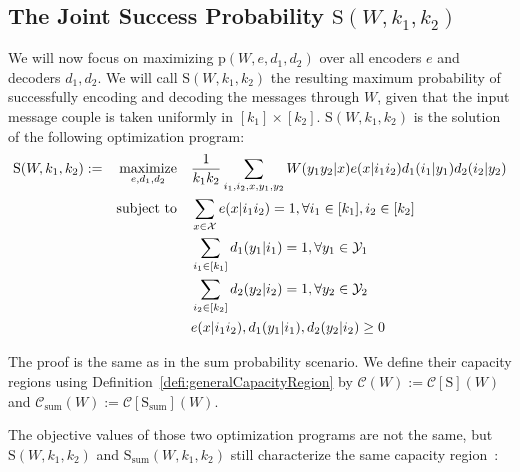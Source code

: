 \subsection{The Joint Success Probability $\mathrm{S}(W,k_1,k_2)$}
We will now focus on maximizing $\mathrm{p}(W,e,d_1,d_2)$ over all encoders $e$ and decoders $d_1,d_2$. We will call $\mathrm{S}(W,k_1,k_2)$ the resulting maximum probability of successfully encoding and decoding the messages through $W$, given that the input message couple is taken uniformly in $[k_1] \times [k_2]$. $\mathrm{S}(W,k_1,k_2)$ is the solution of the following optimization program:
\begin{equation}
  \begin{aligned}
    \mathrm{S}(W,k_1,k_2) := &&\underset{e,d_1,d_2}{\operatorname{\text{maximize}}} &&& \frac{1}{k_1k_2}\sum_{i_1,i_2,x,y_1,y_2} W(y_1y_2|x)e(x|i_1i_2)d_1(i_1|y_1)d_2(i_2|y_2)\\
    &&\operatorname{\text{subject to}} &&& \sum_{x \in \mathcal{X}} e(x|i_1i_2) = 1, \forall i_1 \in [k_1], i_2 \in [k_2]\\
    &&&&& \sum_{i_1 \in [k_1]} d_1(y_1|i_1) = 1, \forall y_1 \in \mathcal{Y}_1\\
    &&&&& \sum_{i_2 \in [k_2]} d_2(y_2|i_2) = 1, \forall y_2 \in \mathcal{Y}_2\\
    &&&&& e(x|i_1i_2), d_1(y_1|i_1), d_2(y_2|i_2) \geq 0
  \end{aligned}
\end{equation}

The proof is the same as in the sum probability scenario. We define their capacity regions using Definition~\ref{defi:generalCapacityRegion} by $\mathcal{C}(W):=\mathcal{C}[\mathrm{S}](W)$ and $\mathcal{C}_{\text{sum}}(W):=\mathcal{C}[{\mathrm{S}}_{\text{sum}}](W)$.

The objective values of those two optimization programs are not the same, but $\mathrm{S}(W,k_1,k_2)$ and $\mathrm{S}_{\text{sum}}(W,k_1,k_2)$ still characterize the same capacity region~\cite{Willems90}: %


